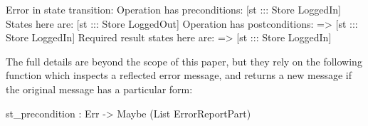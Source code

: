 \small
\begin{code}
Error in state transition:
    Operation has preconditions: [st ::: Store LoggedIn]
    States here are: [st ::: Store LoggedOut]
    Operation has postconditions: \result => [st ::: Store LoggedIn]
    Required result states here are: \result => [st ::: Store LoggedIn]
\end{code}
\normalsize

The full details are beyond the scope of this paper, but they rely on
the following function which inspects a reflected error message, and returns
a new message if the original message has a particular form:

\small
\begin{code}
st_precondition : Err -> Maybe (List ErrorReportPart)
\end{code}
\normalsize

